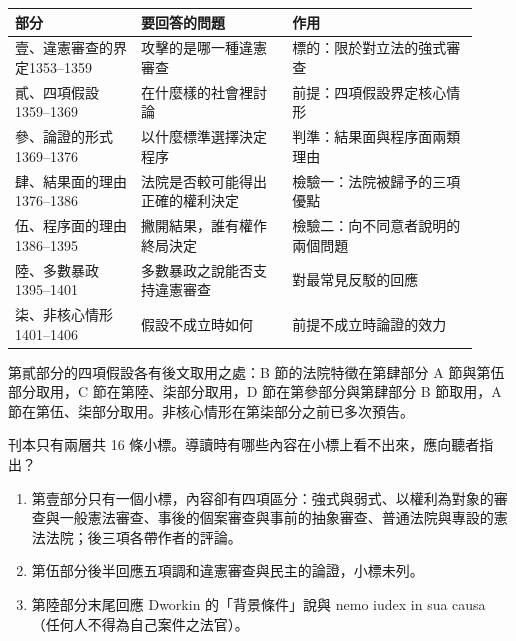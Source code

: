 \begin{longtable}{@{}L{0.25\linewidth}L{0.30\linewidth}L{0.37\linewidth}@{}}
\toprule
部分 & 要回答的問題 & 作用 \\
\midrule
\endhead
壹、違憲審查的界定\newline\textcolor{dimink}{\small 1353--1359} & 攻擊的是哪一種違憲審查 & 標的：限於對立法的強式審查 \\
貳、四項假設\newline\textcolor{dimink}{\small 1359--1369} & 在什麼樣的社會裡討論 & 前提：四項假設界定核心情形 \\
參、論證的形式\newline\textcolor{dimink}{\small 1369--1376} & 以什麼標準選擇決定程序 & 判準：結果面與程序面兩類理由 \\
肆、結果面的理由\newline\textcolor{dimink}{\small 1376--1386} & 法院是否較可能得出正確的權利決定 & 檢驗一：法院被歸予的三項優點 \\
伍、程序面的理由\newline\textcolor{dimink}{\small 1386--1395} & 撇開結果，誰有權作終局決定 & 檢驗二：向不同意者說明的兩個問題 \\
陸、多數暴政\newline\textcolor{dimink}{\small 1395--1401} & 多數暴政之說能否支持違憲審查 & 對最常見反駁的回應 \\
柒、非核心情形\newline\textcolor{dimink}{\small 1401--1406} & 假設不成立時如何 & 前提不成立時論證的效力 \\
\bottomrule
\end{longtable}

第貳部分的四項假設各有後文取用之處：B 節的法院特徵在第肆部分 A 節與第伍部分取用，C 節在第陸、柒部分取用，D 節在第參部分與第肆部分 B 節取用，A 節在第伍、柒部分取用。非核心情形在第柒部分之前已多次預告。


\begin{qaquestion}
刊本只有兩層共 16 條小標。導讀時有哪些內容在小標上看不出來，應向聽者指出？
\end{qaquestion}

\begin{enumerate}
\item 第壹部分只有一個小標，內容卻有四項區分：強式與弱式、以權利為對象的審查與一般憲法審查、事後的個案審查與事前的抽象審查、普通法院與專設的憲法法院；後三項各帶作者的評論。
\item 第伍部分後半回應五項調和違憲審查與民主的論證，小標未列。
\item 第陸部分末尾回應 Dworkin 的「背景條件」說與 nemo iudex in sua causa（任何人不得為自己案件之法官）。
\end{enumerate}
